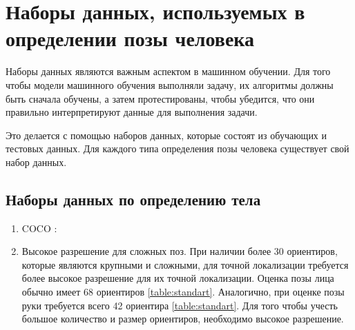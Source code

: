 \section{Наборы данных, используемых в определении позы человека}

Наборы данных являются важным аспектом в машинном обучении. Для того чтобы модели машинного обучения выполняли задачу, их алгоритмы должны быть сначала обучены, а затем протестированы, чтобы убедится, что они правильно интерпретируют данные для выполнения задачи.

Это делается с помощью наборов данных, которые состоят из обучающих и тестовых данных. 
Для каждого типа определения позы человека существует свой набор данных.

\subsection{Наборы данных по определению тела}

 
\begin{enumerate}[label=\arabic*)]
	
	\item COCO \cite{COCO}: 
	
	\item Высокое разрешение для сложных поз.
	При наличии более 30 ориентиров, которые являются крупными и сложными, для точной локализации требуется более высокое разрешение для их точной локализации.
	Оценка позы лица обычно имеет 68 ориентиров \ref{table:standart}. Аналогично, при оценке позы руки требуется всего 42 ориентира \ref{table:standart}. Для того чтобы учесть большое количество и размер ориентиров, необходимо высокое разрешение.  
	
\end{enumerate}
